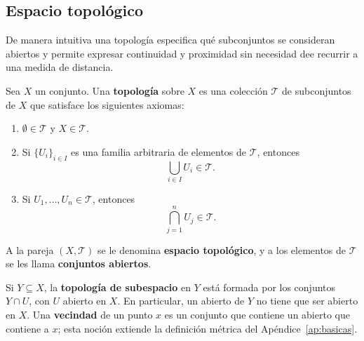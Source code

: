 \subsection{Espacio topológico}

De manera intuitiva una topología especifica qué subconjuntos se consideran abiertos y permite expresar continuidad y proximidad sin necesidad dee recurrir a una medida de distancia.

\begin{definition}
\label{def:espacio-topologico}

Sea $X$ un conjunto. Una \textbf{topología} sobre $X$ es una colección $\mathcal{T}$ de subconjuntos de $X$ que satisface los siguientes axiomas:

\begin{enumerate}
    \item $\emptyset \in \mathcal{T}$ y $X \in \mathcal{T}$.
    \item Si $\{U_i\}_{i \in I}$ es una familia arbitraria de elementos de $\mathcal{T}$, entonces
    \[
        \bigcup_{i \in I} U_i \in \mathcal{T}.
    \]

    \item Si \(U_1,\ldots,U_n \in \mathcal{T}\), entonces
    \[
        \bigcap_{j=1}^{n} U_j \in \mathcal{T}.
    \]
\end{enumerate}

A la pareja $(X,\mathcal{T})$ se le denomina \textbf{espacio topológico}, y a los elementos de $\mathcal{T}$ se les llama \textbf{conjuntos abiertos}.
\end{definition}
Si $Y\subseteq X$, la \textbf{topología de subespacio} en $Y$ está formada por los conjuntos $Y\cap U$, con $U$ abierto en $X$. En particular, un abierto de $Y$ no tiene que ser abierto en $X$. Una \textbf{vecindad} de un punto $x$ es un conjunto que contiene un abierto que contiene a $x$; esta noción extiende la definición métrica del Apéndice~\ref{ap:basicas}.

